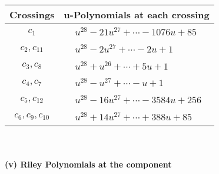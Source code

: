 \documentclass[1p]{elsarticle_modified}
\theoremstyle{definition}
\begin{document}
\begin{tabular}{m{50pt}|m{274pt}}
Crossings & \hspace{64pt}u-Polynomials at each crossing \\
\hline $$\begin{aligned}c_{1}\end{aligned}$$&$\begin{aligned}
&u^{28}-21 u^{27}+\cdots-1076 u+85
\end{aligned}$\\
\hline $$\begin{aligned}c_{2},c_{11}\end{aligned}$$&$\begin{aligned}
&u^{28}-2 u^{27}+\cdots-2 u+1
\end{aligned}$\\
\hline $$\begin{aligned}c_{3},c_{8}\end{aligned}$$&$\begin{aligned}
&u^{28}+u^{26}+\cdots+5 u+1
\end{aligned}$\\
\hline $$\begin{aligned}c_{4},c_{7}\end{aligned}$$&$\begin{aligned}
&u^{28}- u^{27}+\cdots- u+1
\end{aligned}$\\
\hline $$\begin{aligned}c_{5},c_{12}\end{aligned}$$&$\begin{aligned}
&u^{28}-16 u^{27}+\cdots-3584 u+256
\end{aligned}$\\
\hline $$\begin{aligned}c_{6},c_{9},c_{10}\end{aligned}$$&$\begin{aligned}
&u^{28}+14 u^{27}+\cdots+388 u+85
\end{aligned}$\\
\hline
\end{tabular}\\~\\
\newpage\renewcommand{\arraystretch}{1}
\flushleft \textbf{(v) Riley Polynomials at the component}\newline \\
\end{document}
